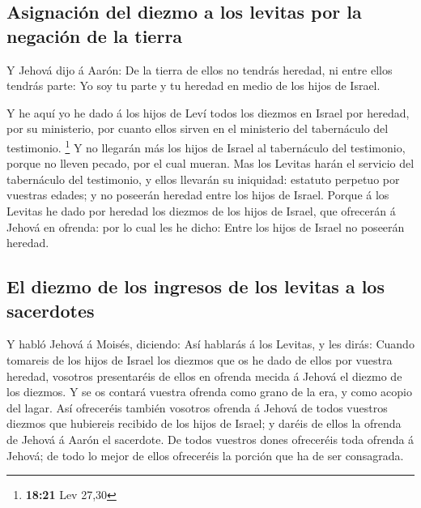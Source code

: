 \hypertarget{asignaciuxf3n-del-diezmo-a-los-levitas-por-la-negaciuxf3n-de-la-tierra}{%
\subsection{Asignación del diezmo a los levitas por la negación de la
tierra}\label{asignaciuxf3n-del-diezmo-a-los-levitas-por-la-negaciuxf3n-de-la-tierra}}

 Y Jehová dijo á Aarón: De la tierra de ellos no tendrás
heredad, ni entre ellos tendrás parte: Yo soy tu parte y tu heredad en
medio de los hijos de Israel.

 Y he aquí yo he dado á los hijos de Leví todos los
diezmos en Israel por heredad, por su ministerio, por cuanto ellos
sirven en el ministerio del tabernáculo del testimonio. \footnote{\textbf{18:21}
  Lev 27,30}  Y no llegarán más los hijos de Israel al
tabernáculo del testimonio, porque no lleven pecado, por el cual mueran.
 Mas los Levitas harán el servicio del tabernáculo del
testimonio, y ellos llevarán su iniquidad: estatuto perpetuo por
vuestras edades; y no poseerán heredad entre los hijos de Israel.
 Porque á los Levitas he dado por heredad los diezmos de
los hijos de Israel, que ofrecerán á Jehová en ofrenda: por lo cual les
he dicho: Entre los hijos de Israel no poseerán heredad.

\hypertarget{el-diezmo-de-los-ingresos-de-los-levitas-a-los-sacerdotes}{%
\subsection{El diezmo de los ingresos de los levitas a los
sacerdotes}\label{el-diezmo-de-los-ingresos-de-los-levitas-a-los-sacerdotes}}

 Y habló Jehová á Moisés, diciendo:  Así
hablarás á los Levitas, y les dirás: Cuando tomareis de los hijos de
Israel los diezmos que os he dado de ellos por vuestra heredad, vosotros
presentaréis de ellos en ofrenda mecida á Jehová el diezmo de los
diezmos.  Y se os contará vuestra ofrenda como grano de
la era, y como acopio del lagar.  Así ofreceréis también
vosotros ofrenda á Jehová de todos vuestros diezmos que hubiereis
recibido de los hijos de Israel; y daréis de ellos la ofrenda de Jehová
á Aarón el sacerdote.  De todos vuestros dones ofreceréis
toda ofrenda á Jehová; de todo lo mejor de ellos ofreceréis la porción
que ha de ser consagrada.

